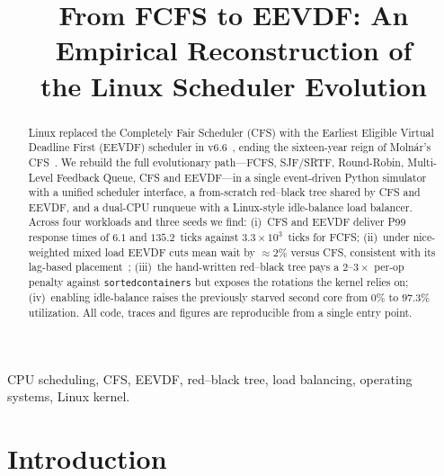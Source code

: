 \documentclass[conference]{IEEEtran}
\begin{document}
\title{From FCFS to EEVDF: An Empirical Reconstruction of\\
the Linux Scheduler Evolution}

\author{
}

\maketitle

\begin{abstract}
Linux replaced the Completely Fair Scheduler (CFS) with the Earliest
Eligible Virtual Deadline First (EEVDF) scheduler in
v6.6~\cite{corbet_eevdf_2023,zijlstra_eevdf_default_2023}, ending the
sixteen-year reign of Moln\'ar's CFS~\cite{molnar_cfs_2007}. We rebuild
the full evolutionary path---FCFS, SJF/SRTF, Round-Robin, Multi-Level
Feedback Queue, CFS and EEVDF---in a single event-driven Python
simulator with a unified scheduler interface, a from-scratch red--black
tree shared by CFS and EEVDF, and a dual-CPU runqueue with a
Linux-style idle-balance load balancer. Across four workloads and
three seeds we find: (i)~CFS and EEVDF deliver P99 response times of
$6.1$ and $135.2$~ticks against $3.3{\times}10^{3}$~ticks for FCFS;
(ii)~under nice-weighted mixed load EEVDF cuts mean wait by
${\approx}2\%$ versus CFS, consistent with its lag-based
placement~\cite{zijlstra_eevdf_lag_2023}; (iii)~the hand-written
red--black tree pays a $2\text{--}3{\times}$ per-op penalty against
\texttt{sortedcontainers} but exposes the rotations the kernel relies
on; (iv)~enabling idle-balance raises the previously starved second
core from $0\%$ to $97.3\%$ utilization. All code, traces and figures
are reproducible from a single entry point.
\end{abstract}

\begin{IEEEkeywords}
CPU scheduling, CFS, EEVDF, red--black tree, load balancing,
operating systems, Linux kernel.
\end{IEEEkeywords}

\section{Introduction}
\end{document}
